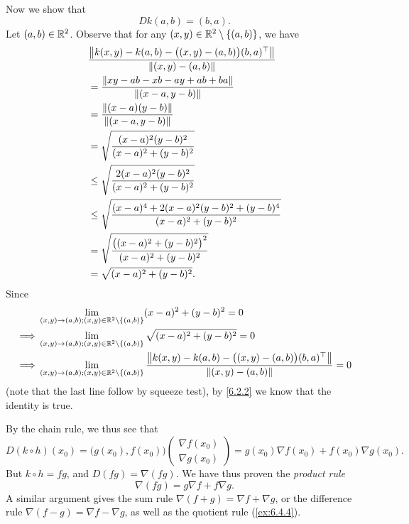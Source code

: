 \begin{eg}
  Now we show that
  \[
    D k(a, b) = (b, a).
  \]
  Let \((a, b) \in \R^2\).
  Observe that for any \((x, y) \in \R^2 \setminus \{(a, b)\}\), we have
  \begin{align*}
     & \frac{\norm*{k(x, y) - k(a, b) - \big((x, y) - (a, b)\big) (b, a)^\top}}{\norm*{(x, y) - (a, b)}} \\
     & = \frac{\norm*{xy - ab - xb - ay + ab + ba}}{\norm*{(x - a, y - b)}}                              \\
     & = \frac{\norm*{(x - a)(y - b)}}{\norm*{(x - a, y - b)}}                                           \\
     & = \sqrt{\frac{(x - a)^2 (y - b)^2}{(x - a)^2 + (y - b)^2}}                                        \\
     & \leq \sqrt{\frac{2 (x - a)^2 (y - b)^2}{(x - a)^2 + (y - b)^2}}                                   \\
     & \leq \sqrt{\frac{(x - a)^4 + 2 (x - a)^2 (y - b)^2 + (y - b)^4}{(x - a)^2 + (y - b)^2}}           \\
     & = \sqrt{\frac{\big((x - a)^2 + (y - b)^2\big)^2}{(x - a)^2 + (y - b)^2}}                          \\
     & = \sqrt{(x - a)^2 + (y - b)^2}.
  \end{align*}
  Since
  \begin{align*}
             & \lim_{(x, y) \to (a, b) ; (x, y) \in \R^2 \setminus \{(a, b)\}} (x - a)^2 + (y - b)^2 = 0                                                                             \\
    \implies & \lim_{(x, y) \to (a, b) ; (x, y) \in \R^2 \setminus \{(a, b)\}} \sqrt{(x - a)^2 + (y - b)^2} = 0                                                                      \\
    \implies & \lim_{(x, y) \to (a, b) ; (x, y) \in \R^2 \setminus \{(a, b)\}} \frac{\norm*{k(x, y) - k(a, b) - \big((x, y) - (a, b)\big) (b, a)^\top}}{\norm*{(x, y) - (a, b)}} = 0
  \end{align*}
  (note that the last line follow by squeeze test),
  by \cref{6.2.2} we know that the identity is true.

  By the chain rule, we thus see that
  \[
    D (k \circ h)(x_0) = \big(g(x_0), f(x_0)\big) \begin{pmatrix}
      \nabla f(x_0) \\
      \nabla g(x_0)
    \end{pmatrix} = g(x_0) \nabla f(x_0) + f(x_0) \nabla g(x_0).
  \]
  But \(k \circ h = fg\), and \(D (fg) = \nabla (fg)\).
  We have thus proven the \emph{product rule}
  \[
    \nabla (fg) = g \nabla f + f \nabla g.
  \]
  A similar argument gives the sum rule \(\nabla (f + g) = \nabla f + \nabla g\), or the difference rule \(\nabla (f - g) = \nabla f - \nabla g\), as well as the quotient rule (\cref{ex:6.4.4}).
\end{eg}

